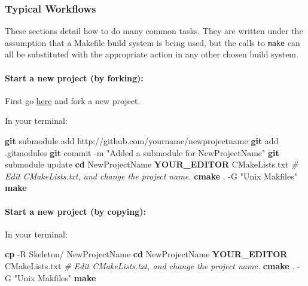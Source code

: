 \documentclass[]{article}
\newenvironment{Shaded}{\begin{snugshade}}{\end{snugshade}}
\newcommand{\KeywordTok}[1]{\textcolor[rgb]{0.13,0.29,0.53}{\textbf{{#1}}}}
\newcommand{\StringTok}[1]{\textcolor[rgb]{0.31,0.60,0.02}{{#1}}}
\newcommand{\CommentTok}[1]{\textcolor[rgb]{0.56,0.35,0.01}{\textit{{#1}}}}
\newcommand{\NormalTok}[1]{{#1}}
\begin{document}
\subsubsection{Typical Workflows}

These sections detail how to do many common tasks. They are written
under the assumption that a Makefile build system is being used, but the
calls to \texttt{make} can all be substituted with the appropriate
action in any other chosen build system.

\paragraph{Start a new project (by forking):}

First go \href{https://github.com/rohit507/GNU-LPC-Skeleton}{here} and
fork a new project.

In your terminal:

\begin{Shaded}
\begin{Highlighting}[]
    \KeywordTok{git} \NormalTok{submodule add http://github.com/yourname/newprojectname}
    \KeywordTok{git} \NormalTok{add .gitmodules}
    \KeywordTok{git} \NormalTok{commit -m }\StringTok{"Added a submodule for NewProjectName"}
    \KeywordTok{git} \NormalTok{submodule update}
    \KeywordTok{cd} \NormalTok{NewProjectName}
    \KeywordTok{YOUR_EDITOR} \NormalTok{CMakeLists.txt}
    \CommentTok{# Edit CMakeLists.txt, and change the project name.}
    \KeywordTok{cmake} \NormalTok{. -G }\StringTok{"Unix Makfiles"}
    \KeywordTok{make}
\end{Highlighting}
\end{Shaded}

\paragraph{Start a new project (by copying):}

In your terminal:

\begin{Shaded}
\begin{Highlighting}[]
    \KeywordTok{cp} \NormalTok{-R Skeleton/ NewProjectName}
    \KeywordTok{cd} \NormalTok{NewProjectName}
    \KeywordTok{YOUR_EDITOR} \NormalTok{CMakeLists.txt}
    \CommentTok{# Edit CMakeLists.txt, and change the project name.}
    \KeywordTok{cmake} \NormalTok{. -G }\StringTok{"Unix Makfiles"}
    \KeywordTok{make}
\end{Highlighting}
\end{Shaded}
\end{document}
